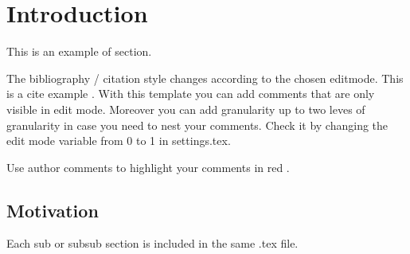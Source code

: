 \section{Introduction}

This is an example of section. 

The bibliography / citation style changes according to the chosen editmode. This is a cite example \cite{leeson2007arrgh}. 
With this template you can add comments that are only visible in edit mode. 
Moreover you can add granularity up to two leves of granularity in case you need to nest your comments.
Check it by changing the edit mode variable from 0 to 1 in settings.tex.

Use author comments to highlight your comments in red . 


\subsection{Motivation}

Each sub or subsub section is included in the same .tex file.


